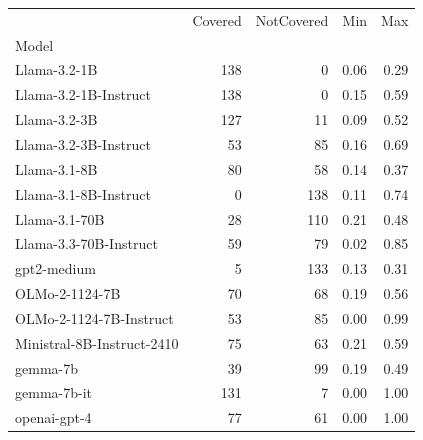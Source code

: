 \begin{tabular}{lrrrr}
\toprule
 & Covered & NotCovered & Min & Max \\
Model &  &  &  &  \\
\midrule
Llama-3.2-1B & 138 & 0 & 0.06 & 0.29 \\
Llama-3.2-1B-Instruct & 138 & 0 & 0.15 & 0.59 \\
Llama-3.2-3B & 127 & 11 & 0.09 & 0.52 \\
Llama-3.2-3B-Instruct & 53 & 85 & 0.16 & 0.69 \\
Llama-3.1-8B & 80 & 58 & 0.14 & 0.37 \\
Llama-3.1-8B-Instruct & 0 & 138 & 0.11 & 0.74 \\
Llama-3.1-70B & 28 & 110 & 0.21 & 0.48 \\
Llama-3.3-70B-Instruct & 59 & 79 & 0.02 & 0.85 \\
gpt2-medium & 5 & 133 & 0.13 & 0.31 \\
OLMo-2-1124-7B & 70 & 68 & 0.19 & 0.56 \\
OLMo-2-1124-7B-Instruct & 53 & 85 & 0.00 & 0.99 \\
Ministral-8B-Instruct-2410 & 75 & 63 & 0.21 & 0.59 \\
gemma-7b & 39 & 99 & 0.19 & 0.49 \\
gemma-7b-it & 131 & 7 & 0.00 & 1.00 \\
openai-gpt-4 & 77 & 61 & 0.00 & 1.00 \\
\bottomrule
\end{tabular}
